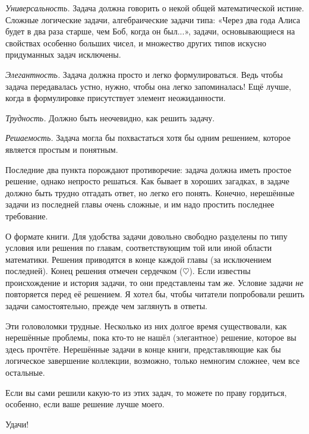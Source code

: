 \documentclass[twoside]{book}
\begin{document}
\textit{Универсальность.}
Задача должна говорить о некой общей математической истине.
Сложные логические задачи, алгебраические задачи типа:
«Через два года Алиса будет в два раза старше, чем Боб, когда он был...», задачи, основывающиеся на свойствах особенно больших  чисел, и множество других типов искусно придуманных задач исключены.

\textit{Элегантность.}
Задача должна  просто и легко формулироваться.
Ведь чтобы задача передавалась устно, нужно, чтобы она легко запоминалась! Ещё лучше, когда в формулировке присутствует элемент неожиданности.

\textit{Трудность.}
Должно быть неочевидно, как решить задачу.

\textit{Решаемость.}
Задача могла бы похвастаться хотя бы одним решением, которое является простым и понятным.

Последние два пункта порождают противоречие: задача должна иметь простое решение, однако непросто решаться.
Как бывает в хороших загадках, в задаче должно быть трудно отгадать ответ, но легко его понять.
Конечно, нерешённые задачи из последней главы очень сложные, и им  надо простить последнее требование.

О формате книги.
Для удобства задачи довольно свободно разделены по типу условия или решения по главам, соответствующим той или иной области математики.
Решения приводятся в конце каждой главы (за исключением последней).
Конец решения отмечен сердечком ($\heartsuit$).
Если известны происхождение и история задачи, то они представлены там же.
Условие задачи \emph{не} повторяется перед её решением.
Я хотел бы, чтобы читатели попробовали решить задачи самостоятельно, прежде чем заглянуть в ответы.

Эти головоломки трудные.
Несколько из них долгое время существовали, как нерешённые проблемы, пока кто-то не нашёл (элегантное) решение, которое вы здесь прочтёте.
Нерешённые задачи в конце книги, представляющие как бы логическое завершение коллекции, возможно, только немногим сложнее, чем все остальные.

Если вы сами решили какую-то из этих задач, то можете по праву гордиться, особенно, если ваше решение лучше моего.

Удачи!



\end{document}
